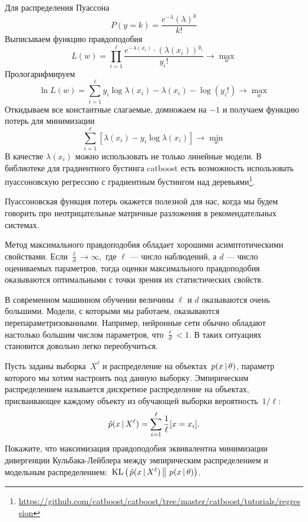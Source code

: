 \documentclass[12pt,fleqn]{article}
\begin{document}
\begin{esSolution}
    Для распределения Пуассона \[
        P(y = k) = \frac{e^{-\lambda} (\lambda)^{k}}{k!}
    \]
    Выписываем функцию правдоподобия 
    \[ 
    L(w) = \prod_{i=1}^{\ell} \frac{e^{-\lambda(x_i)} \cdot (\lambda(x_i))^{y_i}}{y_i!} \to \max_{w}
    \]
    Прологарифмируем
    \[\ln L(w) = \sum_{i=1}^{\ell} y_i \log \lambda(x_i) - \lambda(x_i) - \log(y_i!) \to \max_{w}
    \]
    Откидываем все константные слагаемые, домножаем на $-1$ и получаем функцию потерь для минимизации
    \[
    \sum_{i=1}^{\ell} [\lambda(x_i) - y_i \log \lambda(x_i)] \to \min_{w}
    \]
    В качестве $\lambda(x_i)$ можно использовать не только линейные модели. В библиотеке для градиентного бустинга catboost есть возможность использовать пуассоновскую регрессию с градиентным бустингом над деревьями\footnote{\url{https://github.com/catboost/catboost/tree/master/catboost/tutorials/regression}}.
\end{esSolution}

Пуассоновская функция потерь окажется полезной для нас, когда мы будем говорить про неотрицательные матричные разложения в рекомендательных системах. 

Метод максимального правдоподобия обладает хорошими асимптотическими свойствами. Если $\frac{\ell}{d} \to \infty,$ где $\ell$ --- число наблюдений, а $d$ --- число оцениваемых параметров, тогда оценки максимального правдоподобия оказываются оптимальными с точки зрения их статистических свойств. 

В современном машинном обучении величины $\ell$ и $d$ оказываются очень большими. Модели, с которыми мы работаем, оказываются перепараметризованными. Например, нейронные сети обычно обладают настолько большим числом параметров, что $\frac{\ell}{d} < 1$. В таких ситуациях становится довольно легко переобучиться.

\begin{vkProblem}
    Пусть заданы выборка~$X^\ell$ и распределение на объектах~$p(x \mspace{3mu}{|}\mspace{3mu} \theta)$,
    параметр которого мы хотим настроить под данную выборку.
    Эмпирическим распределением называется дискретное распределение на объектах,
    присваивающее каждому объекту из обучающей выборки вероятность~$1/\ell$:
    \[
        \hat p(x \mspace{3mu}{|}\mspace{3mu} X^\ell)
        =
        \sum_{i = 1}^{\ell}
            \frac{1}{\ell} [x = x_i].
    \]
    Покажите, что максимизация правдоподобия эквивалентна
    минимизации дивергенции Кульбака-Лейблера между эмпирическим
    распределением и
    модельным распределением:~$\text{KL} \left(\left. {\hat p(x \mspace{3mu}{|}\mspace{3mu} X^\ell)} \mspace{3mu} \right\| \mspace{3mu} {p(x \mspace{3mu}{|}\mspace{3mu}\theta)} \right)$.
\end{vkProblem}
\end{document}
